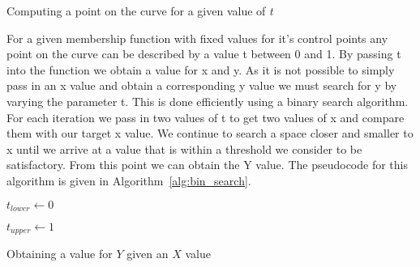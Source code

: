 \begin{algorithm}[H]
\label{alg:recursive}
\SetAlgoLined
{}
\caption{Computing a point on the curve for a given value of \textit{t}}
\end{algorithm}

For a given membership function with fixed values for it's control points any point on the curve can be described by a value t between 0 and 1. By passing t into the function we obtain a value for x and y. As it is not possible to simply pass in an x value and obtain a corresponding y value we must search for y by varying the parameter t. This is done efficiently using a binary search algorithm. For each iteration we pass in two values of t to get two values of x and compare them with our target x value. We continue to search a space closer and smaller to x until we arrive at a value that is within a threshold we consider to be satisfactory. From this point we can obtain the Y value. The pseudocode for this algorithm is given in Algorithm~\ref{alg:bin_search}.

\begin{algorithm}[H]
\SetAlgoLined
{}

$t_{lower} \leftarrow 0$

$t_{upper} \leftarrow 1$

\caption{Obtaining a value for $Y$ given an $X$ value}
\label{alg:bin_search}
\end{algorithm}

